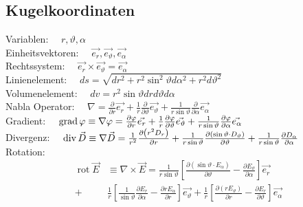 \subsection{Kugelkoordinaten}
Variablen:          $\quad r, \vartheta, \alpha$\\
Einheitsvektoren:   $\quad \vec{e_{r}}, \vec{e_{\vartheta}}, \vec{e_{\alpha}}$\\
Rechtssystem:       $\quad \vec{e_{r}} \times \vec{e_{\vartheta}}=\vec{e_{\alpha}}$\\
Linienelement:      $\quad d s=\sqrt{d r^{2}+r^{2} \sin ^{2} \vartheta d \alpha^{2}+r^{2} d \vartheta^{2}}$\\
Volumenelement:     $\quad d v=r^{2} \sin \vartheta d r d \vartheta d \alpha$\\
Nabla Operator:     $\quad \nabla=\frac{\partial}{\partial r} \vec{e_{r}}+\frac{1}{r} \frac{\partial}{\partial \vartheta} \vec{e_{\vartheta}}+\frac{1}{r \sin \vartheta} \frac{\partial}{\partial \alpha} \vec{e_{\alpha}}$\\
Gradient:           $\quad \operatorname{grad} \varphi \equiv \nabla \varphi=\frac{\partial \varphi}{\partial r} \vec{e_{r}}+\frac{1}{r} \frac{\partial \varphi}{\partial \vartheta} \vec{e_{\vartheta}}+\frac{1}{r \sin \vartheta} \frac{\partial \varphi}{\partial \alpha} \vec{e_{\alpha}}$\\
Divergenz:          $\quad \operatorname{div} \vec{D} \equiv \nabla \vec{D}=\frac{1}{r^{2}} \frac{\partial\left(r^{2} D_{r}\right)}{\partial r}+\frac{1}{r \sin \vartheta} \frac{\partial\left(\sin \vartheta \cdot D_{\vartheta}\right)}{\partial \vartheta}+\frac{1}{r \sin \vartheta} \frac{\partial D_{\alpha}}{\partial \alpha}$\\
Rotation:
\begin{align*}
    \operatorname{rot} \vec{E} & \equiv \nabla \times \vec{E}= \frac{1}{r \sin \vartheta}\left[\frac{\partial\left(\sin \vartheta \cdot E_{\alpha}\right)}{\partial \vartheta}-\frac{\partial E_{\vartheta}}{\partial \alpha}\right] \vec{e_{r}}                                                                                 \\
    +                          & \frac{1}{r}\left[\frac{1}{\sin \vartheta} \frac{\partial E_{r}}{\partial \alpha}-\frac{\partial r E_{\alpha}}{\partial r}\right] \vec{e_{\vartheta}}+\frac{1}{r}\left[\frac{\partial\left(r E_{\vartheta}\right)}{\partial r}-\frac{\partial E_{r}}{\partial \vartheta}\right] \vec{e_{\alpha}}
\end{align*}
